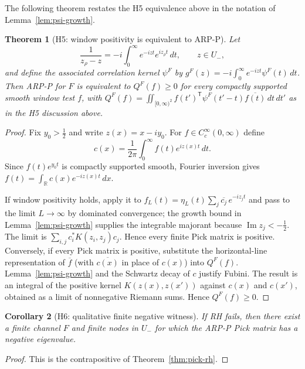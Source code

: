 \documentclass[11pt]{amsart}
\newtheorem{theorem}{Theorem}[section]
\newtheorem{corollary}[theorem]{Corollary}
\theoremstyle{definition}
\theoremstyle{remark}
\theoremstyle{definition}
\renewcommand{\Im}{\operatorname{Im}}
\newcommand{\half}{\tfrac{1}{2}}
\newcommand{\R}{\mathbb{R}}
\begin{document}
The following theorem restates the H5 equivalence above in the notation of Lemma~\ref{lem:psi-growth}.

\begin{theorem}[H5: window positivity is equivalent to ARP-P]\label{thm:live-H5}
Let
\[
   \frac1{z_\rho-z}=-i\int_0^\infty e^{-izt}e^{iz_\rho t}\,dt,\qquad z\in U_-,
\]
and define the associated correlation kernel $\psi^F$ by
$g^F(z)=-i\int_0^\infty e^{-izt}\psi^F(t)\,dt$.  Then ARP-P for $F$ is equivalent to
$Q^F(f)\ge0$ for every compactly supported smooth window test $f$, with
$Q^F(f)=\iint_{[0,\infty)^2}f(t')^{\mathsf T}\psi^F(t'-t)\overline{f(t)}\,dt\,dt'$ as in the H5 discussion above.
\end{theorem}

\begin{proof}
Fix $y_0>\half$ and write $z(x)=x-iy_0$.  For $f\in C_c^\infty(0,\infty)$ define
\[
   c(x)=\frac1{2\pi}\int_0^\infty f(t)e^{iz(x)t}\,dt.
\]
Since $f(t)e^{y_0t}$ is compactly supported smooth, Fourier inversion gives
$f(t)=\int_\R c(x)e^{-iz(x)t}\,dx$.

If window positivity holds, apply it to
$f_L(t)=\eta_L(t)\sum_j \overline{c_j}\, e^{-iz_jt}$ and pass to the limit $L\to\infty$ by dominated convergence;
the growth bound in Lemma~\ref{lem:psi-growth} supplies the integrable majorant because
$\Im z_j<-\half$.  The limit is $\sum_{i,j}c_i^*K(z_i,z_j)c_j$.  Hence every finite Pick matrix is
positive.  Conversely, if every Pick matrix is positive, substitute the horizontal-line representation of
$\overline f$ (with $\overline{c(x)}$ in place of $c(x)$) into $Q^F(f)$.  Lemma~\ref{lem:psi-growth} and the Schwartz decay of $c$ justify Fubini.  The result
is an integral of the positive kernel $K(z(x),z(x'))$ against $c(x)$ and $c(x')$, obtained as a limit of
nonnegative Riemann sums.  Hence $Q^F(f)\ge0$.
\end{proof}

\begin{corollary}[H6: qualitative finite negative witness]\label{cor:live-H6}
If RH fails, then there exist a finite channel $F$ and finite nodes in $U_-$ for which the ARP-P Pick
matrix has a negative eigenvalue.
\end{corollary}

\begin{proof}
This is the contrapositive of Theorem~\ref{thm:pick-rh}.
\end{proof}
\end{document}
